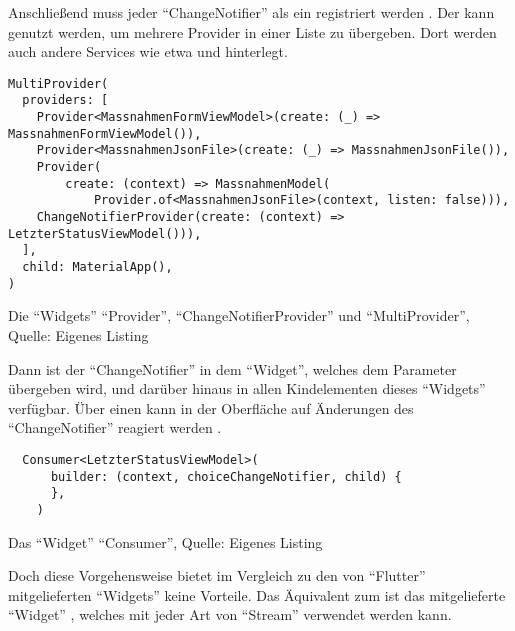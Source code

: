 Anschließend muss jeder \enquote{ChangeNotifier} als ein  registriert werden . 
Der  kann genutzt werden, um mehrere Provider in einer Liste zu übergeben.
Dort werden auch andere Services wie etwa   und   hinterlegt.

\ifIncludeFigures
  \begin{listing}[h]
    \begin{verbatim}
MultiProvider(
  providers: [
    Provider<MassnahmenFormViewModel>(create: (_) => MassnahmenFormViewModel()),
    Provider<MassnahmenJsonFile>(create: (_) => MassnahmenJsonFile()),
    Provider(
        create: (context) => MassnahmenModel(
            Provider.of<MassnahmenJsonFile>(context, listen: false))),
    ChangeNotifierProvider(create: (context) => LetzterStatusViewModel())),
  ],
  child: MaterialApp(),
)
\end{verbatim}
    \caption[Die \enquote{Widgets} \enquote{Provider}, \enquote{ChangeNotifierProvider} und \enquote{MultiProvider}]{Die \enquote{Widgets} \enquote{Provider}, \enquote{ChangeNotifierProvider} und \enquote{MultiProvider}, Quelle: Eigenes Listing}
    \label{lst:MultiProvider}
  \end{listing}
\fi

Dann ist der \enquote{ChangeNotifier} in dem \enquote{Widget}, welches dem Parameter  übergeben wird, und darüber hinaus in allen Kindelementen dieses \enquote{Widgets} verfügbar.
Über einen  kann in der Oberfläche auf Änderungen des \enquote{ChangeNotifier} reagiert werden \Lst{\ref{lst:Consumer}}.

\ifIncludeFigures
  \begin{listing}[h]
    \begin{verbatim}
  Consumer<LetzterStatusViewModel>(
      builder: (context, choiceChangeNotifier, child) {
      },
    )
\end{verbatim}
    \caption[Das \enquote{Widget} \enquote{Consumer}]{Das \enquote{Widget} \enquote{Consumer}, Quelle: Eigenes Listing}
    \label{lst:Consumer}
  \end{listing}
\fi


Doch diese Vorgehensweise bietet im Vergleich zu den von \enquote{Flutter} mitgelieferten \enquote{Widgets} keine Vorteile.
Das Äquivalent zum  ist das mitgelieferte \enquote{Widget} ,
welches mit jeder Art von \enquote{Stream} verwendet werden kann.


